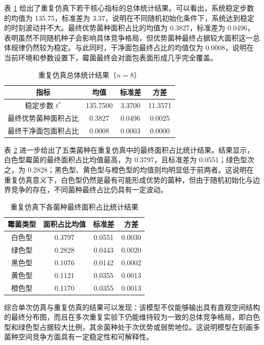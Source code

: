 \documentclass[12pt,a4paper]{ctexart}
\begin{document}
表 \ref{tab:repeat_overall} 给出了重复仿真下若干核心指标的总体统计结果。可以看出，系统稳定步数的均值为 135.75，标准差为 3.37，说明在不同随机初始化条件下，系统达到稳定的时刻波动并不大。最终优势菌种面积占比的均值为 0.3827，标准差为 0.0496，表明虽然不同随机种子会影响具体竞争格局，但优势菌种最终占据较大面积这一总体规律仍然较为稳定。与此同时，干净面包最终占比的均值仅为 0.0008，说明在当前环境和参数设置下，霉菌最终会对面包表面形成几乎完全覆盖。

\begin{table}[H]
\centering
\caption{重复仿真总体统计结果（$n=8$）}
\label{tab:repeat_overall}
\begin{tabular}{cccc}
\toprule
指标 & 均值 & 标准差 & 方差 \\
\midrule
稳定步数 $t^\ast$ & 135.7500 & 3.3700 & 11.3571 \\
最终优势菌种面积占比 & 0.3827 & 0.0496 & 0.0025 \\
最终干净面包面积占比 & 0.0008 & 0.0003 & 0.0000 \\
\bottomrule
\end{tabular}
\end{table}

表 \ref{tab:repeat_species} 进一步给出了五类菌种在重复仿真中的最终面积占比统计结果。结果显示，白色型霉菌的最终面积占比均值最高，为 0.3797，且标准差为 0.0551；绿色型次之，为 0.2828；黑色型、黄色型与橙色型的均值则均明显低于前两者。这说明在重复仿真意义下，白色型仍然是最有可能形成优势的菌种，但由于随机初始化与边界竞争的存在，不同菌种最终占比仍具有一定波动。

\begin{table}[H]
\centering
\caption{重复仿真下各菌种最终面积占比统计结果}
\label{tab:repeat_species}
\begin{tabular}{cccc}
\toprule
霉菌类型 & 面积占比均值 & 标准差 & 方差 \\
\midrule
白色型 & 0.3797 & 0.0551 & 0.0030 \\
绿色型 & 0.2828 & 0.0443 & 0.0020 \\
黑色型 & 0.1076 & 0.0142 & 0.0002 \\
黄色型 & 0.1121 & 0.0355 & 0.0013 \\
橙色型 & 0.1170 & 0.0355 & 0.0013 \\
\bottomrule
\end{tabular}
\end{table}

综合单次仿真与重复仿真的结果可以发现：该模型不仅能够输出具有直观空间结构的最终分布图，而且在多次重复实验下仍能维持较为一致的总体竞争格局，即白色型和绿色型占据较大比例，其余菌种处于次优势或弱势地位。这说明模型在刻画多菌种空间竞争方面具有一定稳定性和可解释性。
\end{document}
